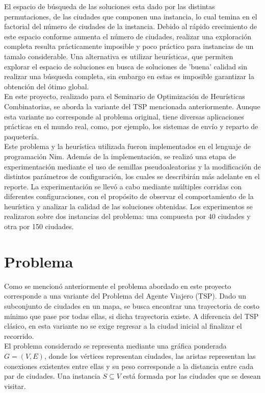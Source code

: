 \documentclass[twoside,11pt]{article}
\begin{document}
El espacio de búsqueda de las soluciones esta dado por las distintas permutaciones, de las ciudades que componen una instancia, lo cual temina en el factorial del número de ciudades de la instancia. Debido al rápido crecimiento de este espacio conforme aumenta el número de ciudades, realizar una exploración completa resulta prácticamente imposible y poco práctico para instancias de un tamalo considerable. Una alternativa es utilizar heurísticas, que permiten explorar el espacio de soluciones en busca de soluciones de 'buena' calidad sin realizar una búsqueda completa, sin embargo en estas es imposible garantizar la obtención del ótimo global.\\

En este proyecto, realizado para el Seminario de Optimización de Heurísticas Combinatorias, se aborda la variante del TSP mencionada anteriormente. Aunque esta variante no corresponde al problema original, tiene diversas aplicaciones prácticas en el mundo real, como, por ejemplo, los sistemas de envío y reparto de paquetería. \\

Este problema y la heurística utilizada fueron implementados en el
lenguaje de programación Nim. Además de la implementación, se realizó una etapa de experimentación mediante el uso de semillas pseudoaleatorias y la modificación de distintos parámetros de configuración, los cuales se describirán más adelante en el reporte. La experimentación se llevó a cabo mediante múltiples corridas con diferentes configuraciones, con el propósito de observar el comportamiento de la heurística y analizar la calidad de las soluciones
obtenidas. Los experimentos se realizaron sobre dos instancias del problema: una compuesta por 40 ciudades y otra por 150 ciudades. 


\section{Problema}

Como se mencionó anteriormente el problema abordado en este proyecto corresponde a una variante del Problema del Agente Viajero (TSP). Dado un subconjunto de ciudades en un mapa, se busca
encontrar una trayectoria de costo mínimo que pase por todas ellas, si dicha
trayectoria existe. A diferencia del TSP clásico, en esta variante no se exige
regresar a la ciudad inicial al finalizar el recorrido.\\

El problema considerado se representa mediante una gráfica ponderada $G=(V,E)$, donde los vértices representan ciudades, las aristas representan las conexiones existentes entre ellas y su peso corresponde a la distancia entre cada par de ciudades. Una instancia $S\subseteq V$ está formada por las ciudades que se desean visitar.\\
\end{document}
